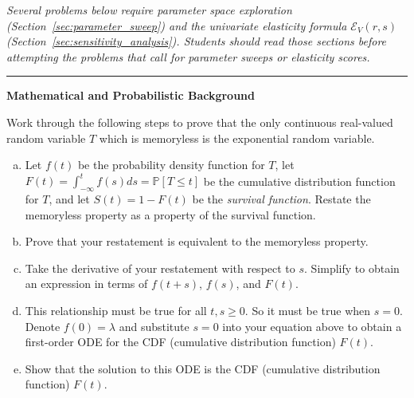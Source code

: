 
\noindent \textup{\it Several problems below require parameter space exploration (Section~\ref{sec:parameter_sweep}) and the univariate elasticity formula $\mathcal{E}_{V}(r,s)$ (Section~\ref{sec:sensitivity_analysis}). Students should read those sections before attempting the problems that call for parameter sweeps or elasticity scores.}\label{sec:homework}

\newcommand{\hwcategory}[1]{\item[]\par\smallskip\noindent\rule{\linewidth}{0.4pt}\par\smallskip\noindent\textbf{#1}\par\smallskip}

\begin{exercises}
\hwcategory{Mathematical and Probabilistic Background}
\item Work through the following steps to prove that the only continuous real-valued random variable $T$ which is memoryless is the exponential random variable.\label{ex:hw_memoryless_rigorous}%
\begin{enumerate}[(a)]
\item Let $f(t)$ be the probability density function for $T$, let $F(t) = \int_{-\infty}^{t} f(s) ds = \mathbb{P}[T \leq t]$ be the cumulative distribution function for $T$, and let $S(t) = 1 - F(t)$ be the \textit{survival function}. Restate the memoryless property as a property of the survival function.
\item Prove that your restatement is equivalent to the memoryless property.
\item Take the derivative of your restatement with respect to $s$. Simplify to obtain an expression in terms of $f(t + s)$, $f(s)$, and $F(t)$.
\item This relationship must be true for all $t, s \geq 0$. So it must be true when $s = 0$. Denote $f(0) = \lambda$ and substitute $s = 0$ into your equation above to obtain a first-order ODE for the CDF (cumulative distribution function) $F(t)$.
\item Show that the solution to this ODE is the CDF (cumulative distribution function) $F(t)$.
\end{enumerate}


\end{exercises}
